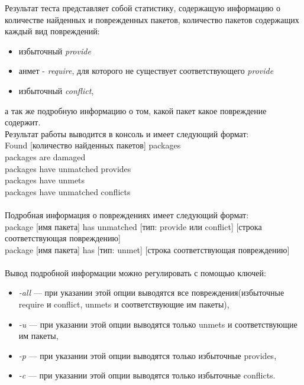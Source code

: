 Результат теста представляет собой статистику, содержащую информацию 
о количестве найденных и поврежденных пакетов, количество пакетов содержащих
каждый вид повреждений:\\
\begin{itemize}
\item{избыточный \textit{provide}}
\item{анмет - \textit{require}, для которого не существует соответствующего \textit{provide}}
\item{избыточный \textit{conflict}},
\end{itemize}
а так же подробную информацию о том, какой пакет какое повреждение содержит.\\
Результат работы выводится в консоль и имеет следующий формат:\\
Found [количество найденных пакетов] packages\\
[количество поврежденных пакетов] packages are damaged\\
[количество пакетов с избыточными provide] packages have unmatched provides\\
[количество пакетов с анметами] packages have unmets\\
[количество пакетов с избыточными conflict] packages have unmatched conflicts\\
\\
Подробная информация о повреждениях имеет следующий формат:\\
package [имя пакета] has unmatched [тип: provide или conflict] [строка соответствующая повреждению]\\
package [имя пакета] has [тип: unmet] [строка соответствующая повреждению]\\
\\
Вывод подробной информации можно регулировать с помощью ключей:\\
\begin{itemize}
\item{\emph{-all} --- при указании этой опции выводятся все повреждения(избыточные require и conflict, unmets и
соответствующие им пакеты),}
\item{\emph{-u} --- при указании этой опции выводятся только unmets и соответствующие им пакеты,}
\item{\emph{-p} --- при указании этой опции выводятся только  избыточные provides,}
\item{\emph{-c} --- при указании этой опции выводятся только избыточные conflicts.}
\end{itemize}

